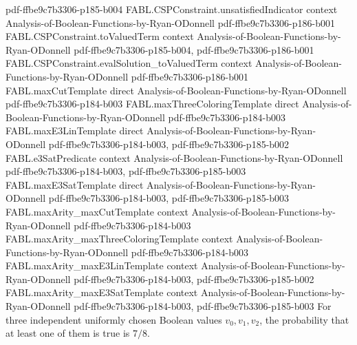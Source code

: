 \begin{theorem}
  {pdf-ffbe9c7b3306-p185-b004}
\proofstep
  {FABL.CSPConstraint.unsatisfiedIndicator}
  {context}
  {Analysis-of-Boolean-Functions-by-Ryan-ODonnell}
  {pdf-ffbe9c7b3306-p186-b001}
\proofstep
  {FABL.CSPConstraint.toValuedTerm}
  {context}
  {Analysis-of-Boolean-Functions-by-Ryan-ODonnell}
  {pdf-ffbe9c7b3306-p185-b004,
    pdf-ffbe9c7b3306-p186-b001}
\proofstep
  {FABL.CSPConstraint.evalSolution_toValuedTerm}
  {context}
  {Analysis-of-Boolean-Functions-by-Ryan-ODonnell}
  {pdf-ffbe9c7b3306-p186-b001}
\proofstep
  {FABL.maxCutTemplate}
  {direct}
  {Analysis-of-Boolean-Functions-by-Ryan-ODonnell}
  {pdf-ffbe9c7b3306-p184-b003}
\proofstep
  {FABL.maxThreeColoringTemplate}
  {direct}
  {Analysis-of-Boolean-Functions-by-Ryan-ODonnell}
  {pdf-ffbe9c7b3306-p184-b003}
\proofstep
  {FABL.maxE3LinTemplate}
  {direct}
  {Analysis-of-Boolean-Functions-by-Ryan-ODonnell}
  {pdf-ffbe9c7b3306-p184-b003,
    pdf-ffbe9c7b3306-p185-b002}
\proofstep
  {FABL.e3SatPredicate}
  {context}
  {Analysis-of-Boolean-Functions-by-Ryan-ODonnell}
  {pdf-ffbe9c7b3306-p184-b003,
    pdf-ffbe9c7b3306-p185-b003}
\proofstep
  {FABL.maxE3SatTemplate}
  {direct}
  {Analysis-of-Boolean-Functions-by-Ryan-ODonnell}
  {pdf-ffbe9c7b3306-p184-b003,
    pdf-ffbe9c7b3306-p185-b003}
\proofstep
  {FABL.maxArity_maxCutTemplate}
  {context}
  {Analysis-of-Boolean-Functions-by-Ryan-ODonnell}
  {pdf-ffbe9c7b3306-p184-b003}
\proofstep
  {FABL.maxArity_maxThreeColoringTemplate}
  {context}
  {Analysis-of-Boolean-Functions-by-Ryan-ODonnell}
  {pdf-ffbe9c7b3306-p184-b003}
\proofstep
  {FABL.maxArity_maxE3LinTemplate}
  {context}
  {Analysis-of-Boolean-Functions-by-Ryan-ODonnell}
  {pdf-ffbe9c7b3306-p184-b003,
    pdf-ffbe9c7b3306-p185-b002}
\proofstep
  {FABL.maxArity_maxE3SatTemplate}
  {context}
  {Analysis-of-Boolean-Functions-by-Ryan-ODonnell}
  {pdf-ffbe9c7b3306-p184-b003,
    pdf-ffbe9c7b3306-p185-b003}
\label{FABL.expect_plainE3SatIndicator}
\leanok
For three independent uniformly chosen Boolean values $v_0,v_1,v_2$, the probability
that at least one of them is true is $7/8$.
\end{theorem}

